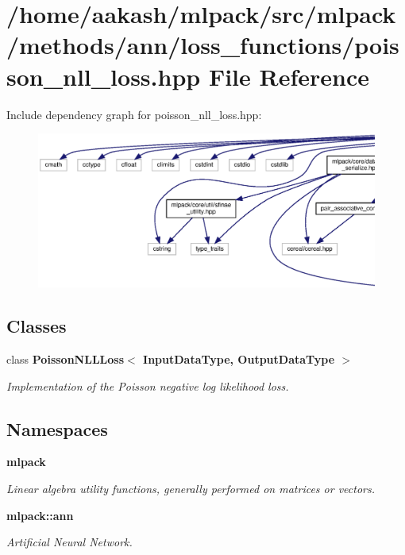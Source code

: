 \section{/home/aakash/mlpack/src/mlpack/methods/ann/loss\+\_\+functions/poisson\+\_\+nll\+\_\+loss.hpp File Reference}
\label{poisson__nll__loss_8hpp}
Include dependency graph for poisson\+\_\+nll\+\_\+loss.\+hpp\+:
\nopagebreak
\begin{figure}[H]
\begin{center}
\leavevmode
\includegraphics[width=350pt]{poisson__nll__loss_8hpp__incl}
\end{center}
\end{figure}
\subsection*{Classes}
\begin{DoxyCompactItemize}
\item 
class \textbf{ Poisson\+N\+L\+L\+Loss$<$ Input\+Data\+Type, Output\+Data\+Type $>$}
\begin{DoxyCompactList}\small\item\em Implementation of the Poisson negative log likelihood loss. \end{DoxyCompactList}\end{DoxyCompactItemize}
\subsection*{Namespaces}
\begin{DoxyCompactItemize}
\item 
 \textbf{ mlpack}
\begin{DoxyCompactList}\small\item\em Linear algebra utility functions, generally performed on matrices or vectors. \end{DoxyCompactList}\item 
 \textbf{ mlpack\+::ann}
\begin{DoxyCompactList}\small\item\em Artificial Neural Network. \end{DoxyCompactList}\end{DoxyCompactItemize}


